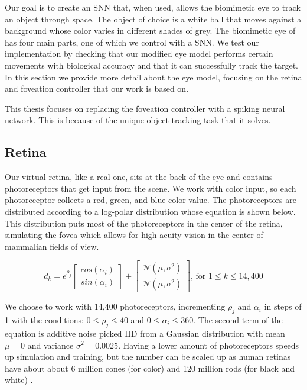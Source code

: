 \documentclass[../taasin.tex]{subfiles}
\begin{document}
Our goal is to create an SNN that, when used, allows the biomimetic eye to track an object through space. The object of choice is a white ball that moves against a background whose color varies in different shades of grey. The biomimetic eye of \cite{Arjun} has four main parts, one of which we control with a SNN. We test our implementation by checking that our modified eye model performs certain movements with biological accuracy and that it can successfully track the target. In this section we provide more detail about the eye model, focusing on the retina and foveation controller that our work is based on.

This thesis focuses on replacing the foveation controller with a spiking neural network. This is because of the unique object tracking task that it solves.


\subsection{Retina}

Our virtual retina, like a real one, sits at the back of the eye and contains photoreceptors that get input from the scene. We work with color input, so each photoreceptor collects a red, green, and blue color value. The photoreceptors are distributed according to a log-polar distribution whose equation is shown below. This distribution puts most of the photoreceptors in the center of the retina, simulating the fovea which allows for high acuity vision in the center of mammalian  fields of view.

$$
d_k = e^{\rho_j} 
    \begin{bmatrix} 
        cos( \alpha_i) \\ 
        sin( \alpha_i) 
    \end{bmatrix}
    +
    \begin{bmatrix} 
        \mathcal{N}(\mu, \sigma^2) \\ 
        \mathcal{N}(\mu, \sigma^2)
    \end{bmatrix}
    \text{, for }
    1 \leq k \leq 14,400
$$


We choose to work with 14,400 photoreceptors, incrementing $\rho_j$ and $\alpha_i$ in steps of 1 with the conditions: $ 0 \leq \rho_j \leq 40 $ and $ 0 \leq \alpha_i \leq 360 $. The second term of the equation is additive noise picked IID from a Gaussian distribution with mean $ \mu = 0 $ and variance $ \sigma^2 = 0.0025 $. Having a lower amount of photoreceptors speeds up simulation and training, but the number can be scaled up as human retinas have about about 6 million cones (for color) and 120 million rods (for black and white) \cite{rodsAndCones}. 
\end{document}
